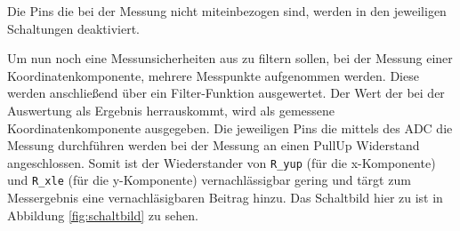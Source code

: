 Die Pins die bei der Messung nicht miteinbezogen sind, werden in den jeweiligen Schaltungen deaktiviert. 

Um nun noch eine Messunsicherheiten aus zu filtern sollen, bei der Messung einer Koordinatenkomponente, mehrere Messpunkte aufgenommen werden. Diese werden anschließend über ein Filter-Funktion ausgewertet. Der Wert der bei der Auswertung als Ergebnis herrauskommt, wird als gemessene Koordinatenkomponente ausgegeben.
Die jeweiligen Pins die mittels des ADC die Messung durchführen werden bei der Messung an einen PullUp Widerstand angeschlossen. Somit ist der Wiederstander von \verb$R_yup$ (für die x-Komponente) und \verb$R_xle$ (für die y-Komponente) vernachlässigbar gering und tärgt zum Messergebnis eine vernachläsigbaren Beitrag hinzu.
Das Schaltbild hier zu ist in Abbildung \ref{fig:schaltbild} zu sehen. 

